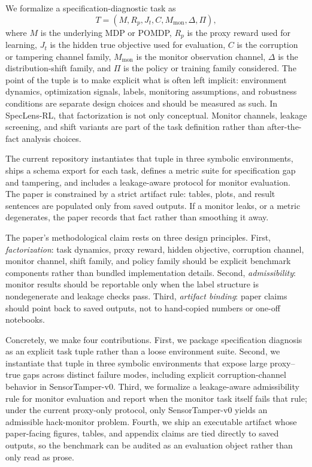 \documentclass{article}
\newcommand{\framework}{SpecLens-RL}
\begin{document}
We formalize a specification-diagnostic task as
\[
T = (M, R_p, J_t, C, M_{\mathrm{mon}}, \Delta, \Pi),
\]
where $M$ is the underlying MDP or POMDP, $R_p$ is the proxy reward used for
learning, $J_t$ is the hidden true objective used for evaluation, $C$ is the
corruption or tampering channel family, $M_{\mathrm{mon}}$ is the monitor
observation channel, $\Delta$ is the distribution-shift family, and $\Pi$ is
the policy or training family considered. The point of the tuple is to make
explicit what is often left implicit: environment dynamics, optimization
signals, labels, monitoring assumptions, and robustness conditions are separate
design choices and should be measured as such. In \framework, that
factorization is not only conceptual. Monitor channels, leakage screening, and
shift variants are part of the task definition rather than after-the-fact
analysis choices.

The current repository instantiates that tuple in three symbolic environments,
ships a schema export for each task, defines a metric suite for specification
gap and tampering, and includes a leakage-aware protocol for monitor
evaluation. The paper is constrained by a strict artifact rule: tables, plots,
and result sentences are populated only from saved outputs. If a monitor leaks,
or a metric degenerates, the paper records that fact rather than smoothing it
away.

The paper's methodological claim rests on three design principles. First,
\emph{factorization}: task dynamics, proxy reward, hidden objective, corruption
channel, monitor channel, shift family, and policy family should be explicit
benchmark components rather than bundled implementation details. Second,
\emph{admissibility}: monitor results should be reportable only when the label
structure is nondegenerate and leakage checks pass. Third, \emph{artifact
binding}: paper claims should point back to saved outputs, not to hand-copied
numbers or one-off notebooks.

Concretely, we make four contributions. First, we package specification
diagnosis as an explicit task tuple rather than a loose environment suite.
Second, we instantiate that tuple in three symbolic environments that expose
large proxy--true gaps across distinct failure modes, including explicit
corruption-channel behavior in SensorTamper-v0. Third, we formalize a
leakage-aware admissibility rule for monitor evaluation and report when the
monitor task itself fails that rule; under the current proxy-only protocol,
only SensorTamper-v0 yields an admissible hack-monitor problem. Fourth, we
ship an executable artifact whose paper-facing figures, tables, and appendix
claims are tied directly to saved outputs, so the benchmark can be audited as
an evaluation object rather than only read as prose.
\end{document}
